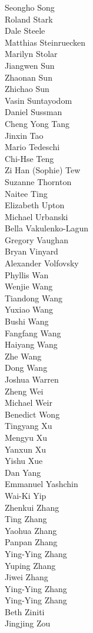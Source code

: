 Seongho Song\\
Roland Stark\\
Dale Steele\\
Matthias Steinruecken\\
Marilyn Stolar\\
Jiangwen Sun\\
Zhaonan Sun\\
Zhichao Sun\\
Vasin  Suntayodom\\
Daniel Sussman\\
Cheng Yong Tang\\
Jinxin Tao\\
Mario  Tedeschi\\
Chi-Hse Teng\\
Zi Han (Sophie) Tew\\
Suzanne Thornton\\
Naitee Ting\\
Elizabeth Upton\\
Michael Urbanski\\
Bella Vakulenko-Lagun\\
Gregory Vaughan\\
Bryan Vinyard\\
Alexander Volfovsky\\
Phyllis Wan\\
Wenjie Wang\\
Tiandong Wang\\
Yuxiao Wang\\
Bushi Wang\\
Fangfang Wang\\
Haiyang Wang\\
Zhe Wang\\
Dong Wang\\
Joshua Warren\\
Zheng Wei\\
Michael Weir\\
Benedict Wong\\
Tingyang Xu\\
Mengyu Xu\\
Yanxun Xu\\
Yishu Xue\\
Dan Yang\\
Emmanuel Yashchin\\
Wai-Ki Yip\\
Zhenkui Zhang\\
Ting Zhang\\
Yaohua  Zhang\\
Panpan Zhang\\
Ying-Ying Zhang\\
Yuping Zhang\\
Jiwei Zhang\\
Ying-Ying Zhang\\
Ying-Ying Zhang\\
Beth Ziniti\\
Jingjing Zou\\
